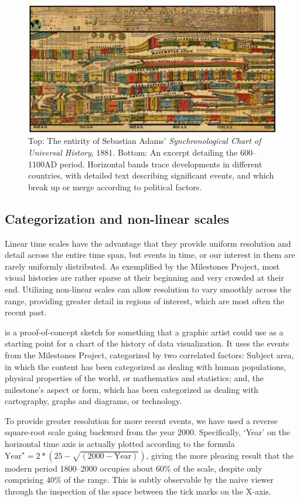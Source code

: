 \begin{figure}[!htb]
  \centering
  \includegraphics[width=\textwidth,clip]{fig/Adams1881-5}
  \caption{Top: The entirity of Sebastian Adams' \emph{Synchronological Chart of Universal History}, 1881. Bottom: An excerpt detailing the 600--1100AD period. Horizontal bands trace developments in different countries, with detailed text describing significant events, and which break up or merge according to political factors.}
  \label{fig:Adams1881}
\end{figure}

\subsection{Categorization and non-linear scales}
Linear time scales have the advantage that they provide uniform resolution and detail across the entire time span, but events in time, or our interest in them are rarely uniformly distributed. As exemplified by the Milestones Project, most visual histories are rather sparse at their beginning and very crowded at their end. Utilizing non-linear scales can allow resolution to vary smoothly across the range, providing greater detail in regions of interest, which are most often the recent past.

 is a proof-of-concept sketch for something that a graphic artist could use as a starting point for a chart of the history of data visualization. It uses the events from the Milestones Project, categorized by two correlated factors: Subject area, in which the content has been categorized as dealing with human populations, physical properties of the world, or mathematics and statistics; and, the milestone's aspect or form, which has been categorized as dealing with cartography, graphs and diagrams, or technology. 

To provide greater resolution for more recent events, we have used a reverse square-root scale going backward from the year 2000. Specifically, `Year' on the horizontal time axis is actually plotted according to the formula $\textrm{Year}^\star = 2* (25 - \sqrt{(2000 - \textrm{Year})})$, giving the more pleasing result that the modern period 1800--2000 occupies about 60\% of the scale, despite only comprising 40\% of the range.  This is subtly observable by the naive viewer through the inspection of the space between the tick marks on the X-axis.

